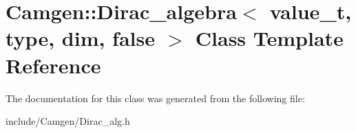 \hypertarget{a00126}{}\section{Camgen\+:\+:Dirac\+\_\+algebra$<$ value\+\_\+t, type, dim, false $>$ Class Template Reference}
\label{a00126}


The documentation for this class was generated from the following file\+:\begin{DoxyCompactItemize}
\item 
include/\+Camgen/Dirac\+\_\+alg.\+h\end{DoxyCompactItemize}

